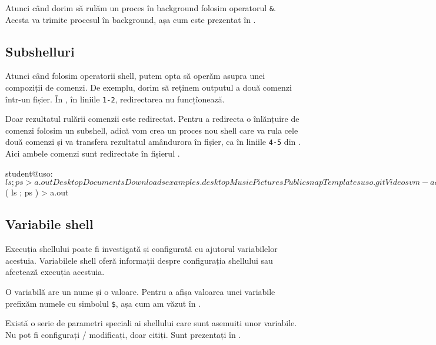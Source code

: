 Atunci când dorim să rulăm un proces în background folosim operatorul \texttt{\&}. Acesta
va trimite procesul în background, așa cum este prezentat în .

\subsection{Subshelluri}
\label{sec:cli:shell-func:subshell}

Atunci când folosim operatorii shell, putem opta să operăm asupra unei compoziții
de comenzi. De exemplu, dorim să reținem outputul a două comenzi într-un fișier. În , în liniile \texttt{1-2}, redirectarea nu funcțîonează.

Doar rezultatul rulării comenzii  este redirectat. Pentru a redirecta o
înlănțuire de comenzi folosim un subshell, adică vom crea un proces nou shell
care va rula cele două comenzi și va transfera rezultatul amândurora în fișier, ca în liniile \texttt{4-5} din . Aici ambele comenzi sunt redirectate în fișierul .

\begin{screen}[caption={Subshelluri și redirectare},label={lst:cli:subshell}]
student@uso:~$ ls ; ps > a.out
Desktop  Documents  Downloads  examples.desktop  Music  Pictures  Public  snap  Templates  uso.git  Videos  vm-actions-log.txt

student@uso:~$ ( ls ; ps ) > a.out
\end{screen}

\subsection{Variabile shell}
\label{sec:cli:shell-func:vars}

Execuția shellului poate fi investigată și configurată cu ajutorul variabilelor
acestuia. Variabilele shell oferă informații despre configurația shellului sau
afectează execuția acestuia.

O variabilă are un nume și o valoare. Pentru a afișa valoarea unei variabile
prefixăm numele cu simbolul \texttt{\$}, așa cum am văzut în .

Există o serie de parametri speciali ai shellului care sunt asemuiți unor
variabile. Nu pot fi configurați / modificați, doar citiți. Sunt prezentați în .

